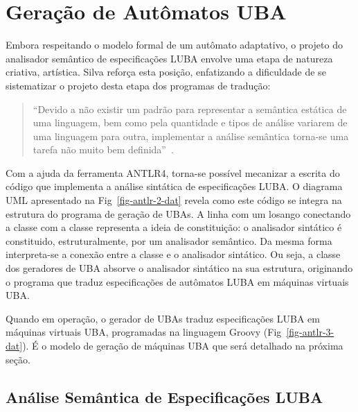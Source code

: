 \section{Geração de Autômatos UBA}
\label{sec:isv:geracao}

Embora respeitando o modelo formal de um autômato adaptativo, o projeto do analisador semântico de especificações LUBA envolve uma etapa de natureza criativa, artística. Silva reforça esta posição, enfatizando a dificuldade de se sistematizar o projeto desta etapa dos programas de tradução:

   \begin{quote}
   ``Devido a não existir um padrão para representar a semântica estática de uma linguagem, bem como pela quantidade e tipos de análise variarem de uma linguagem para outra, implementar a análise semântica torna-se uma tarefa não muito bem definida''~\cite{silva:2011}.
   \end{quote}

Com a ajuda da ferramenta ANTLR4, torna-se possível mecanizar a escrita do código que implementa a análise sintática de especificações LUBA. O diagrama UML apresentado na Fig~\ref{fig-antlr-2-dat} revela como este código se integra na estrutura do programa de geração de UBAs. A linha com um losango conectando a classe  com a classe  representa a ideia de constituição: o analisador sintático é constituido, estruturalmente, por um analisador semântico. Da mesma forma interpreta-se a conexão entre a classe  e o analisador sintático. Ou seja, a classe dos geradores de UBA absorve o analisador sintático na sua estrutura, originando o programa que traduz especificações de autômatos LUBA em máquinas virtuais UBA.


Quando em operação, o gerador de UBAs traduz especificações LUBA em máquinas virtuais UBA, programadas na linguagem Groovy (Fig~\ref{fig-antlr-3-dat}). É o modelo de geração de máquinas UBA que será detalhado na próxima seção.


\subsection{Análise Semântica de Especificações LUBA}

